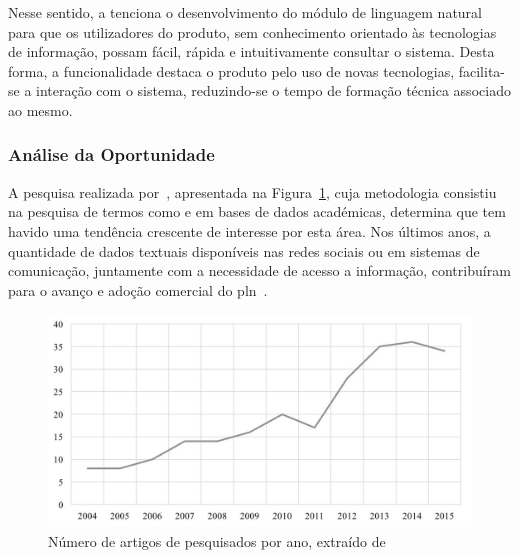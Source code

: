 Nesse sentido, a {\companyname} tenciona o desenvolvimento do módulo de linguagem natural para que os utilizadores do produto, sem conhecimento orientado às tecnologias de informação, possam fácil, rápida e intuitivamente consultar o sistema. Desta forma, a funcionalidade destaca o produto pelo uso de novas tecnologias, facilita-se a interação com o sistema, reduzindo-se o tempo de formação técnica associado ao mesmo. 

\subsubsection{Análise da Oportunidade}
A pesquisa realizada por~\textcite{roadmap_nlp_research_is}, apresentada na Figura~\ref{fig:number_articles_per_year_nlp}, cuja metodologia consistiu na pesquisa de termos como  e  em bases de dados académicas, determina que tem havido uma tendência crescente de interesse por esta área. Nos últimos anos, a quantidade de dados textuais disponíveis nas redes sociais ou em sistemas de comunicação, juntamente com a necessidade de acesso a informação, contribuíram para o avanço e adoção comercial do \gls{pln}~\parencite{roadmap_nlp_research_is}.

\begin{figure}[!ht]
    \centering
    \includegraphics[width=.9\textwidth]{ch02/assets/number_articles_nlp.jpg}
    \caption{Número de artigos de  pesquisados por ano, extraído de~\textcite{roadmap_nlp_research_is}}
    \label{fig:number_articles_per_year_nlp}
\end{figure}


